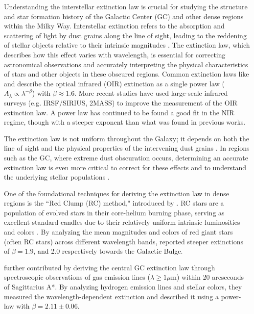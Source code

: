 \documentclass[twocolumn]{aastex631}
\begin{document}
Understanding the interstellar extinction law is crucial for studying the
structure and star formation history of the Galactic Center (GC) and other dense
regions within the Milky Way. Interstellar extinction refers to the absorption
and scattering of light by dust grains along the line of sight, leading to the
reddening of stellar objects relative to their intrinsic magnitudes \citep[e.g.][]{Draine2003}. The extinction law, which describes how this effect
varies with wavelength, is essential for correcting astronomical observations
and accurately interpreting the physical characteristics of stars and other
objects in these obscured regions. Common extinction laws like \citep{Cardelli1989}
and \citep{Fitzpatrick1999} describe the optical infrared (OIR) extinction as a single power law
($A_\lambda \propto \lambda^{-\beta}$) with $\beta \approx 1.6$.  More recent studies
\citep[e.g.][]{Nishiyama2009,Fritz2011}
have used large-scale infrared surveys  (e.g. IRSF/SIRIUS, 2MASS)
to improve the measurement of the OIR extinction law.
A power law has continued to be found a good fit in the NIR regime, though with a steeper
exponent than what was found in previous works.

The extinction law is not uniform throughout the Galaxy; it depends on both the
line of sight and the physical properties of the intervening dust grains
\citep{Fitzpatrick2007}. In regions such as the GC, where
extreme dust obscuration occurs, determining an accurate extinction law is even
more critical to correct for these effects and to understand the underlying
stellar populations \citep{Nishiyama2009,NoguerasLara2018}.

One of the foundational techniques for deriving the extinction law in dense
regions is the ``Red Clump (RC) method," introduced by \citep{Wozniak1996}.
RC stars are a population of evolved stars in their core-helium burning phase,
serving as excellent standard candles due to their relatively uniform intrinsic
luminosities and colors \citep{Girardi2001}. By analyzing the mean
magnitudes and colors of red giant stars (often RC  stars) across different wavelength bands,
\citep{Messineo2005,Nishiyama2009} reported steeper
extinctions of $\beta = 1.9$, and 2.0 respectively towards the Galactic Bulge.

\citep{Fritz2011} further contributed by deriving the central GC extinction law
through spectroscopic observations of gas emission lines ($\lambda \geq 1\mu$m) within 20 arcseconds of
Sagittarius A*. By analyzing hydrogen emission lines and stellar colors, they
measured the wavelength-dependent extinction and described it using a power-law
with $\beta = 2.11 \pm 0.06$.
\end{document}
